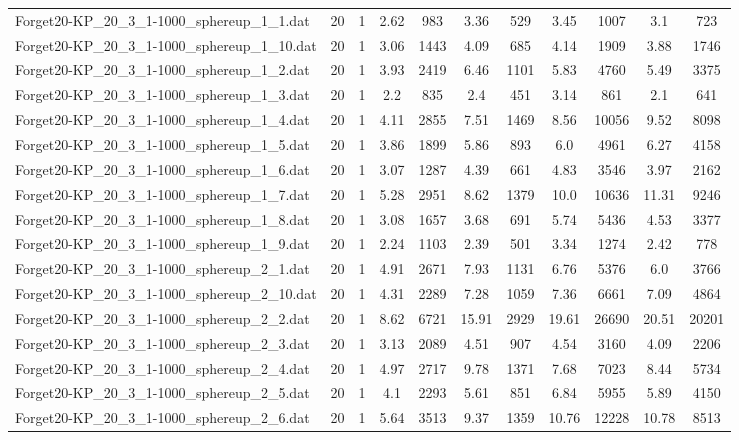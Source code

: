 \begin{table}[!ht]
\begin{tabular}{lcccccccccc}
Forget20-KP\_20\_3\_1-1000\_sphereup\_1\_1.dat & 20 & 1 & 2.62 & 983 & 3.36 & 529 & 3.45 & 1007 & 3.1 & 723 \\
Forget20-KP\_20\_3\_1-1000\_sphereup\_1\_10.dat & 20 & 1 & 3.06 & 1443 & 4.09 & 685 & 4.14 & 1909 & 3.88 & 1746 \\
Forget20-KP\_20\_3\_1-1000\_sphereup\_1\_2.dat & 20 & 1 & 3.93 & 2419 & 6.46 & 1101 & 5.83 & 4760 & 5.49 & 3375 \\
Forget20-KP\_20\_3\_1-1000\_sphereup\_1\_3.dat & 20 & 1 & 2.2 & 835 & 2.4 & 451 & 3.14 & 861 & 2.1 & 641 \\
Forget20-KP\_20\_3\_1-1000\_sphereup\_1\_4.dat & 20 & 1 & 4.11 & 2855 & 7.51 & 1469 & 8.56 & 10056 & 9.52 & 8098 \\
Forget20-KP\_20\_3\_1-1000\_sphereup\_1\_5.dat & 20 & 1 & 3.86 & 1899 & 5.86 & 893 & 6.0 & 4961 & 6.27 & 4158 \\
Forget20-KP\_20\_3\_1-1000\_sphereup\_1\_6.dat & 20 & 1 & 3.07 & 1287 & 4.39 & 661 & 4.83 & 3546 & 3.97 & 2162 \\
Forget20-KP\_20\_3\_1-1000\_sphereup\_1\_7.dat & 20 & 1 & 5.28 & 2951 & 8.62 & 1379 & 10.0 & 10636 & 11.31 & 9246 \\
Forget20-KP\_20\_3\_1-1000\_sphereup\_1\_8.dat & 20 & 1 & 3.08 & 1657 & 3.68 & 691 & 5.74 & 5436 & 4.53 & 3377 \\
Forget20-KP\_20\_3\_1-1000\_sphereup\_1\_9.dat & 20 & 1 & 2.24 & 1103 & 2.39 & 501 & 3.34 & 1274 & 2.42 & 778 \\
Forget20-KP\_20\_3\_1-1000\_sphereup\_2\_1.dat & 20 & 1 & 4.91 & 2671 & 7.93 & 1131 & 6.76 & 5376 & 6.0 & 3766 \\
Forget20-KP\_20\_3\_1-1000\_sphereup\_2\_10.dat & 20 & 1 & 4.31 & 2289 & 7.28 & 1059 & 7.36 & 6661 & 7.09 & 4864 \\
Forget20-KP\_20\_3\_1-1000\_sphereup\_2\_2.dat & 20 & 1 & 8.62 & 6721 & 15.91 & 2929 & 19.61 & 26690 & 20.51 & 20201 \\
Forget20-KP\_20\_3\_1-1000\_sphereup\_2\_3.dat & 20 & 1 & 3.13 & 2089 & 4.51 & 907 & 4.54 & 3160 & 4.09 & 2206 \\
Forget20-KP\_20\_3\_1-1000\_sphereup\_2\_4.dat & 20 & 1 & 4.97 & 2717 & 9.78 & 1371 & 7.68 & 7023 & 8.44 & 5734 \\
Forget20-KP\_20\_3\_1-1000\_sphereup\_2\_5.dat & 20 & 1 & 4.1 & 2293 & 5.61 & 851 & 6.84 & 5955 & 5.89 & 4150 \\
Forget20-KP\_20\_3\_1-1000\_sphereup\_2\_6.dat & 20 & 1 & 5.64 & 3513 & 9.37 & 1359 & 10.76 & 12228 & 10.78 & 8513 \\

\end{tabular}
\end{table}

